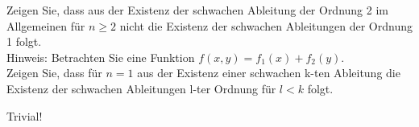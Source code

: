 \begin{exercise}

Zeigen Sie, dass aus der Existenz der schwachen Ableitung der Ordnung 2 im Allgemeinen für $n \geq 2$ nicht die Existenz der schwachen Ableitungen der Ordnung 1 folgt. \\

Hinweis: Betrachten Sie eine Funktion $f(x,y) = f_1(x) + f_2(y)$. \\

Zeigen Sie, dass für $n = 1$ aus der Existenz einer schwachen k-ten Ableitung die Existenz der schwachen Ableitungen l-ter Ordnung für $l < k$ folgt.

\end{exercise}

\begin{solution}

Trivial!

\end{solution}
